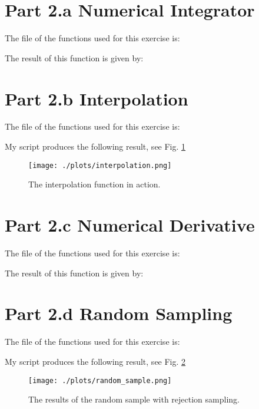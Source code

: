 \section{Part 2.a Numerical Integrator}

The file of the functions used for this exercise is:



The result of this function is given by:



\section{Part 2.b Interpolation}

The file of the functions used for this exercise is:



My script produces the following result, see Fig. \ref{fig:interp}

\begin{figure}[h!]
  \centering
  \texttt{[image: ./plots/interpolation.png]}
  \caption{The interpolation function in action.}
  \label{fig:interp}
\end{figure}

\section{Part 2.c Numerical Derivative}

The file of the functions used for this exercise is:



The result of this function is given by:



\section{Part 2.d Random Sampling}

The file of the functions used for this exercise is:



My script produces the following result, see Fig. \ref{fig:rand_sample}

\begin{figure}[h!]
  \centering
  \texttt{[image: ./plots/random\_sample.png]}
  \caption{The results of the random sample with rejection sampling.}
  \label{fig:rand_sample}
\end{figure}

